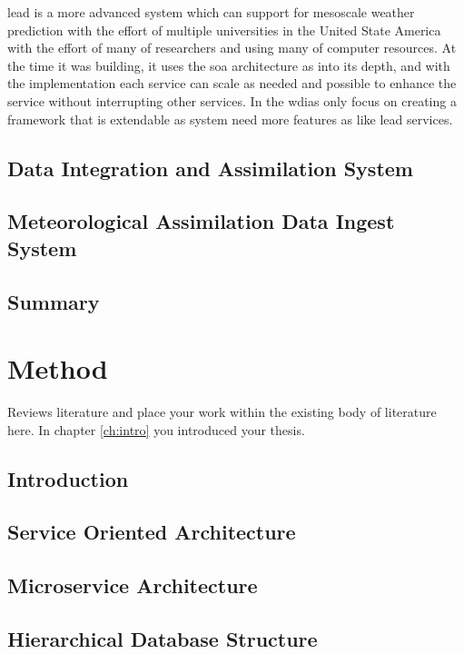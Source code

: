 \documentclass[a4paper,oneside,12pt]{report}
\begin{document}
\acrshort{lead} is a more advanced system which can support for mesoscale weather prediction with the effort of multiple universities in the United State America with the effort of many of researchers and using many of computer resources. At the time it was building, it uses the \acrshort{soa} architecture as into its depth, and with the implementation each service can scale as needed and possible to enhance the service without interrupting other services. In the \acrshort{wdias} only focus on creating a framework that is extendable as system need more features as like \acrshort{lead} services.

\section{Data Integration and Assimilation System}
\label{se:dias}

\section{Meteorological Assimilation Data Ingest System}
\label{se:madis}

\section{Summary}


\chapter{Method}
\label{ch:method}


Reviews literature and place your work within the existing body of literature here. In chapter \ref{ch:intro} you introduced your thesis.

\section{Introduction}

\section{Service Oriented Architecture}

\section{Microservice Architecture}

\section{Hierarchical Database Structure}
\end{document}
